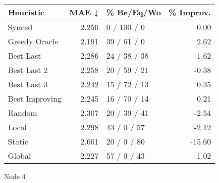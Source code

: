 \begin{tabular}{lrlr}
\toprule
\textbf{Heuristic} & \textbf{MAE ↓} & \textbf{\% Be/Eq/Wo} & \textbf{\% Improv.} \\
\midrule
            Synced &          2.250 &          0 / 100 / 0 &                0.00 \\
     Greedy Oracle &          2.191 &          39 / 61 / 0 &                2.62 \\
         Best Last &          2.286 &         24 / 38 / 38 &               -1.62 \\
       Best Last 2 &          2.258 &         20 / 59 / 21 &               -0.38 \\
       Best Last 3 &          2.242 &         15 / 72 / 13 &                0.35 \\
    Best Improving &          2.245 &         16 / 70 / 14 &                0.21 \\
            Random &          2.307 &         20 / 39 / 41 &               -2.54 \\
             Local &          2.298 &          43 / 0 / 57 &               -2.12 \\
            Static &          2.601 &          20 / 0 / 80 &              -15.60 \\
            Global &          2.227 &          57 / 0 / 43 &                1.02 \\
\bottomrule
\end{tabular}
\caption{Node 4}
\label{tab:hr_non_lr05_le1_bs4_4}
